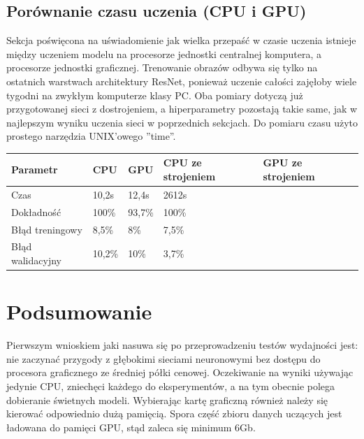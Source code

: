 \documentclass[12pt,a4paper,twoside,titlepage,openright]{book}
\begin{document}
\subsection{Porównanie czasu uczenia (CPU i GPU)}
Sekcja poświęcona na uświadomienie jak wielka przepaść w czasie uczenia istnieje między uczeniem modelu na procesorze jednostki centralnej komputera, a procesorze jednostki graficznej. Trenowanie obrazów odbywa się tylko na ostatnich warstwach architektury ResNet, ponieważ uczenie całości zajęłoby wiele tygodni na zwykłym komputerze klasy PC.
Oba pomiary dotyczą już przygotowanej sieci z dostrojeniem, a hiperparametry pozostają takie same, jak w najlepszym wyniku uczenia sieci w poprzednich sekcjach. Do pomiaru czasu użyto prostego narzędzia UNIX'owego ''time''.

%
%

\begin{center}
    \begin{tabular}{ | l | l | l | l | l |}
    \hline
    Parametr & CPU & GPU & CPU ze strojeniem & GPU ze strojeniem \\ \hline
    Czas & 10,2s & 12,4s & 2612s &  \\ \hline
    Dokładność & 100\% & 93,7\% & 100\% & \\ \hline
    Błąd treningowy & 8,5\% & 8\% & 7,5\% &  \\ \hline
    Błąd walidacyjny & 10,2\% & 10\% & 3,7\% &  \\ \hline
    \end{tabular}
\end{center}

\section{Podsumowanie}
Pierwszym wnioskiem jaki nasuwa się po przeprowadzeniu testów wydajności jest: nie zaczynać przygody z głębokimi sieciami neuronowymi bez dostępu do procesora graficznego ze średniej półki cenowej. Oczekiwanie na wyniki używając jedynie CPU, zniechęci każdego do eksperymentów, a na tym obecnie polega dobieranie świetnych modeli. Wybierając kartę graficzną również należy się kierować odpowiednio dużą pamięcią. Spora część zbioru danych uczących jest ładowana do pamięci GPU, stąd zaleca się minimum 6Gb.
\end{document}
